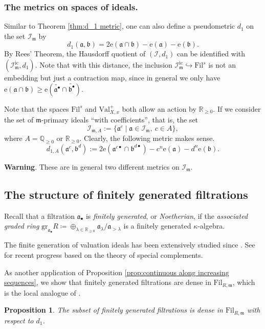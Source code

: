 \documentclass[11pt, leqno]{amsart}%
\theoremstyle{plain}
\newtheorem{proposition}[theorem]{Proposition}
\theoremstyle{definition}
\theoremstyle{remark}
\newcommand{\cI}{\mathcal{I}}
\newcommand{\bQ}{\mathbb{Q}}
\newcommand{\bR}{\mathbb{R}}
\newcommand{\fa}{\mathfrak{a}}
\newcommand{\fb}{\mathfrak{b}}
\newcommand{\fm}{\mathfrak{m}}
\newcommand{\ic}{\mathrm{ic}}
\newcommand{\Val}{\mathrm{Val}}
\newcommand{\gr}{\mathrm{gr}}
\newcommand{\e}{\mathrm{e}}
\newcommand{\Fil}{\mathrm{Fil}}
\numberwithin{equation}{section}
\begin{document}
\subsubsection{The metrics on spaces of ideals.}
Similar to Theorem \ref{thm:d_1 metric}, one can also define a pseudometric $d_1$ on the set $\cI_\fm$ by
\[
d_1(\fa,\fb)=2\e(\fa\cap\fb)-\e(\fa)-\e(\fb).
\]
By Rees' Theorem, the Hausdorff quotient of $(\cI,d_1)$ can be identified with $(\cI^{\ic}_\fm,d_1)$. Note that with this distance, the inclusion $\cI^{\ic}_\fm\hookrightarrow\Fil^s$ is not an embedding but just a contraction map, since in general we only have $\e(\fa\cap\fb)\ge \e(\widetilde{\fa^\bullet}\cap\widetilde{\fb^\bullet})$. %

Note that the spaces $\Fil^s$ and $\Val_{X,x}^+$ both allow an action by $\bR_{\ge 0}$. If we consider the set of $\fm$-primary ideals ``with coefficients'', that is, the set 
\[
    \cI_{\fm,A}:=\{\fa^c\mid \fa\in\cI_\fm,\ c\in A\},
\]
where $A=\bQ_{\ge 0}$ or $\bR_{\ge 0}$. Clearly, the following metric makes sense.
\[
    d_{1,A}(\fa^c,\fb^d):=2\e(\fa^{c\bullet}\cap\fb^{d\bullet})-c^n\e(\fa)-d^n\e(\fb).
\]

\noindent\textbf{Warning}. These are in general two different metrics on $\cI_\fm$.


\subsection{The structure of finitely generated filtrations}

Recall that a filtration $\fa_\bullet$ is \emph{finitely generated}, or \emph{Noetherian}, if the \emph{associated graded ring} $\gr_{\fa_\bullet}R\coloneqq \oplus_{\lambda\in\bR_{\ge 0}}\fa_\lambda/\fa_{>\lambda}$ is a finitely generated $\kappa$-algebra. 

The finite generation of valuation ideals has been extensively studied since \cite{BCHM10}. See \cites{LXZ22,XZ25} for recent progress based on the theory of special complements.

As another application of Proposition \ref{prop:continuous along increasing sequences}, we show that finitely generated filtrations are dense in $\Fil_{R,\fm}$, which is the local analogue of \cite[Corollary 3.19]{BJ21}.


\begin{proposition}\label{prop:fg density}
    The subset of finitely generated filtrations is dense in $\Fil_{R,\fm}$ with respect to $d_1$.
\end{proposition}
\end{document}
